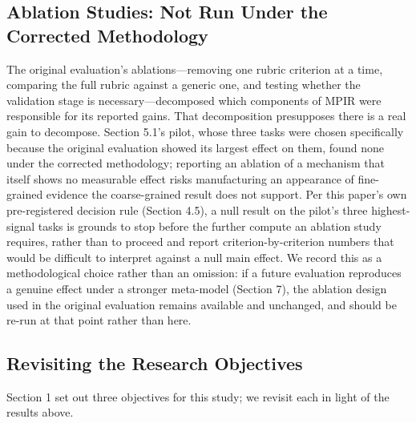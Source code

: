 \documentclass[a4paper,fleqn]{cas-sc}
\begin{document}
\subsection{Ablation Studies: Not Run Under the Corrected Methodology}

The original evaluation's ablations---removing one rubric criterion at a time, comparing the full rubric against a generic one, and testing whether the validation stage is necessary---decomposed which components of MPIR were responsible for its reported gains. That decomposition presupposes there is a real gain to decompose. Section 5.1's pilot, whose three tasks were chosen specifically because the original evaluation showed its largest effect on them, found none under the corrected methodology; reporting an ablation of a mechanism that itself shows no measurable effect risks manufacturing an appearance of fine-grained evidence the coarse-grained result does not support. Per this paper's own pre-registered decision rule (Section 4.5), a null result on the pilot's three highest-signal tasks is grounds to stop before the further compute an ablation study requires, rather than to proceed and report criterion-by-criterion numbers that would be difficult to interpret against a null main effect. We record this as a methodological choice rather than an omission: if a future evaluation reproduces a genuine effect under a stronger meta-model (Section 7), the ablation design used in the original evaluation remains available and unchanged, and should be re-run at that point rather than here.

\subsection{Revisiting the Research Objectives}

Section 1 set out three objectives for this study; we revisit each in light of the results above.
\end{document}
